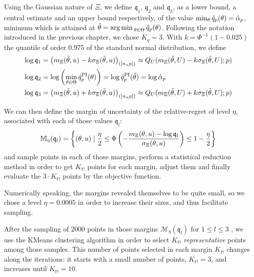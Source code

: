 \documentclass[../../Main_ManuscritThese.tex]{subfiles}
\begin{document}
Using the Gaussian nature of $\Xi$, we define $\mathfrak{q}_1$,
$\mathfrak{q}_2$ and $\mathfrak{q}_3$, as a lower bound, a central
estimate and an upper bound respectively, of the value
$\min_\theta \hat{q}_p(\theta)=\hat{\alpha}_p$, minimum which is attained at
$\hat{\theta}= \operatorname*{arg\,min \,}_{\theta\in\Theta} \hat{q}_p(\theta)$. Following the
notation introduced in the previous chapter, we chose $K_q = 3$.
With $k=\Phi^{-1}(1 - 0.025)$ the quantile of order \num{0.975} of the
standard normal distribution, we define
\begin{align}
  \log {\mathfrak{q}}_1 &= \left(m_{\Xi}(\tilde{\theta}, u) - k \sigma_{\Xi}(\tilde{\theta}, u)\right)_{([n_{u}p])} \approx Q_U(m_{\Xi}(\tilde{\theta}, U) - k \sigma_{\Xi}(\tilde{\theta}, U); p) \\
  \log \mathfrak{q}_2 &= \log \left(\min_{\theta\in\Theta}\hat{q}^{\mathrm{PI}}_p(\theta) \right) = \log \hat{q}^{\mathrm{PI}}_p(\tilde{\theta}) = \log \hat{\alpha}_p \\
  \log \mathfrak{q}_3 &= \left(m_{\Xi}(\tilde{\theta}, u) + k \sigma_{\Xi}(\tilde{\theta}, u)\right)_{([n_{u}p])} \approx Q_U(m_{\Xi}(\tilde{\theta}, U) + k \sigma_{\Xi}(\tilde{\theta}, U); p)
\end{align}

We can then define the margin of uncertainty of the relative-regret of
level $\eta$, associated with each of those values $\mathfrak{q}_l$:
\begin{equation}
  \mathbb{M}_{\eta}(\mathfrak{q}_l) = \left\{(\theta, u) \mid \frac{\eta}{2} \leq \Phi\left(-\frac{m_{\Xi}(\theta, u) - \log \mathfrak{q}_l}{\sigma_{\Xi}(\theta, u)}\right) \leq 1 - \frac{\eta}{2}\right\}
\end{equation}
and sample points in each of those margins, perform a statistical
reduction method in order to get $K_{\mathbb{M}}$ points for each
margin, adjust them and finally evaluate the $3\cdot K_{\mathbb{M}}$
points by the objective function.


Numerically speaking, the margins revealed themselves to be quite
small, so we chose a level $\eta=0.0005$ in order to increase their
sizes, and thus facilitate sampling.

After the sampling of \num{2000} points in those margins
$\mathcal{M}_{\eta}(\mathfrak{q}_l)$ for $1\leq l \leq 3$ , we use the
KMeans clustering algorithm in order to select $K_{\mathbb{M}}$
\emph{representative} points among those samples.  This number of
points selected in each margin $K_{\mathbb{M}}$ changes along the
iterations: it starts with a small number of points,
$K_{\mathbb{M}}=3$, and increases until $K_{\mathbb{M}}=10$.
\end{document}
